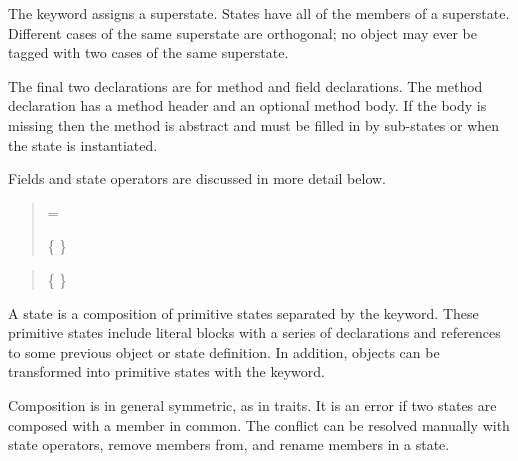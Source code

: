 The   keyword assigns a superstate. States have 
all of the members of a superstate. Different cases of the same superstate 
are orthogonal; no object may ever be tagged with two cases of the same superstate.

The final two declarations are for method and field declarations.  The
method declaration has a method header and an
optional method body.  If the body is missing then
the method is abstract and must be filled in by sub-states or when the
state is instantiated.

Fields and state operators are discussed in more detail below.

\begin{quote}


 = 

 \{  \}

\end{quote}

\begin{quote}


 {}  %


 {} 

 \{  \}

 {} 

\end{quote}

A state is a composition of primitive states separated by the
 keyword.  These primitive states include literal blocks
with a series of declarations and references to some
previous object or state definition. In addition, objects can be transformed into primitive states
with the  keyword. 

Composition is in general symmetric, as in traits.  It is an error if two states are composed with a member in common. The conflict can be resolved manually with state operators, remove members from, and rename members in a state. 



